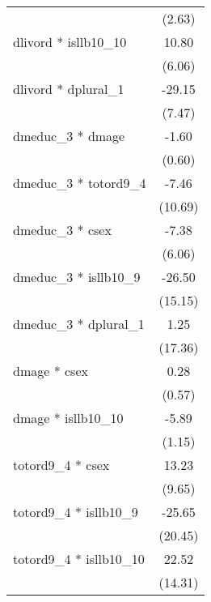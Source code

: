 {\begin{tabular}{l*{1}{c}}
                                                  &      (2.63)\\
dlivord * isllb10\_10                              &       10.80\\
                                                  &      (6.06)\\
dlivord * dplural\_1                               &      -29.15\\
                                                  &      (7.47)\\
dmeduc\_3 * dmage                                  &       -1.60\\
                                                  &      (0.60)\\
dmeduc\_3 * totord9\_4                              &       -7.46\\
                                                  &     (10.69)\\
dmeduc\_3 * csex                                   &       -7.38\\
                                                  &      (6.06)\\
dmeduc\_3 * isllb10\_9                              &      -26.50\\
                                                  &     (15.15)\\
dmeduc\_3 * dplural\_1                              &        1.25\\
                                                  &     (17.36)\\
dmage * csex                                      &        0.28\\
                                                  &      (0.57)\\
dmage * isllb10\_10                                &       -5.89\\
                                                  &      (1.15)\\
totord9\_4 * csex                                  &       13.23\\
                                                  &      (9.65)\\
totord9\_4 * isllb10\_9                             &      -25.65\\
                                                  &     (20.45)\\
totord9\_4 * isllb10\_10                            &       22.52\\
                                                  &     (14.31)\\

\end{tabular}}
